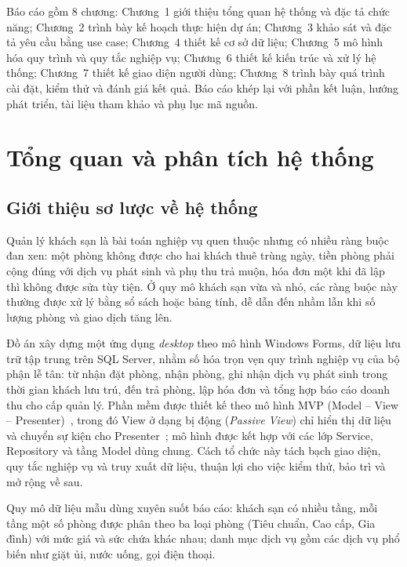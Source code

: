 \documentclass[14pt]{report}
\begin{document}
Báo cáo gồm 8 chương: Chương~1 giới thiệu tổng quan hệ thống và đặc tả chức năng; Chương~2 trình bày kế hoạch thực hiện dự án; Chương~3 khảo sát và đặc tả yêu cầu bằng use case; Chương~4 thiết kế cơ sở dữ liệu; Chương~5 mô hình hóa quy trình và quy tắc nghiệp vụ; Chương~6 thiết kế kiến trúc và xử lý hệ thống; Chương~7 thiết kế giao diện người dùng; Chương~8 trình bày quá trình cài đặt, kiểm thử và đánh giá kết quả. Báo cáo khép lại với phần kết luận, hướng phát triển, tài liệu tham khảo và phụ lục mã nguồn.



\chapter{Tổng quan và phân tích hệ thống}

\section{Giới thiệu sơ lược về hệ thống}

Quản lý khách sạn là bài toán nghiệp vụ quen thuộc nhưng có nhiều ràng buộc đan xen: một phòng không được cho hai khách thuê trùng ngày, tiền phòng phải cộng đúng với dịch vụ phát sinh và phụ thu trả muộn, hóa đơn một khi đã lập thì không được sửa tùy tiện. Ở quy mô khách sạn vừa và nhỏ, các ràng buộc này thường được xử lý bằng sổ sách hoặc bảng tính, dễ dẫn đến nhầm lẫn khi số lượng phòng và giao dịch tăng lên.

Đồ án xây dựng một ứng dụng \emph{desktop} theo mô hình Windows Forms, dữ liệu lưu trữ tập trung trên SQL Server, nhằm số hóa trọn vẹn quy trình nghiệp vụ của bộ phận lễ tân: từ nhận đặt phòng, nhận phòng, ghi nhận dịch vụ phát sinh trong thời gian khách lưu trú, đến trả phòng, lập hóa đơn và tổng hợp báo cáo doanh thu cho cấp quản lý. Phần mềm được thiết kế theo mô hình MVP (Model -- View -- Presenter)~\cite{potel}, trong đó View ở dạng bị động (\emph{Passive View}) chỉ hiển thị dữ liệu và chuyển sự kiện cho Presenter~\cite{fowler}; mô hình được kết hợp với các lớp Service, Repository và tầng Model dùng chung. Cách tổ chức này tách bạch giao diện, quy tắc nghiệp vụ và truy xuất dữ liệu, thuận lợi cho việc kiểm thử, bảo trì và mở rộng về sau.

Quy mô dữ liệu mẫu dùng xuyên suốt báo cáo: khách sạn có nhiều tầng, mỗi tầng một số phòng được phân theo ba loại phòng (Tiêu chuẩn, Cao cấp, Gia đình) với mức giá và sức chứa khác nhau; danh mục dịch vụ gồm các dịch vụ phổ biến như giặt ủi, nước uống, gọi điện thoại.
\end{document}
